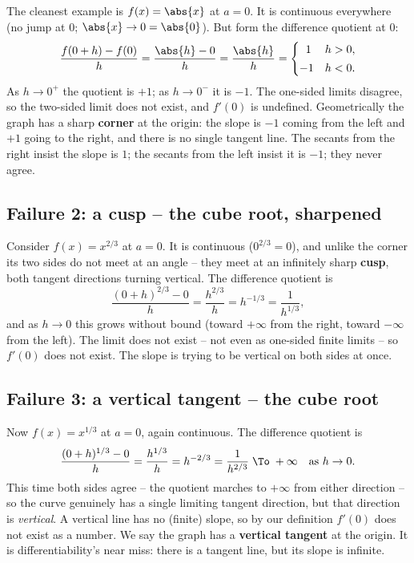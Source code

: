 The cleanest example is $f(x) = \abs{x}$ at $a = 0$. It is continuous everywhere
(no jump at $0$; $\abs{x} \to 0 = \abs{0}$). But form the difference quotient at
$0$:
\[
  \frac{f(0 + h) - f(0)}{h} = \frac{\abs{h} - 0}{h} = \frac{\abs{h}}{h}
  = \begin{cases} \;\;1 & h > 0, \\[2pt] -1 & h < 0. \end{cases}
\]
As $h \to 0^+$ the quotient is $+1$; as $h \to 0^-$ it is $-1$. The one-sided
limits disagree, so the two-sided limit does not exist, and $f'(0)$ is undefined.
Geometrically the graph has a sharp \textbf{corner} at the origin: the slope is
$-1$ coming from the left and $+1$ going to the right, and there is no single
tangent line. The secants from the right insist the slope is $1$; the secants from
the left insist it is $-1$; they never agree.

\subsection*{Failure 2: a cusp -- the cube root, sharpened}

Consider $f(x) = x^{2/3}$ at $a = 0$. It is continuous ($0^{2/3} = 0$), and unlike
the corner its two sides do not meet at an angle -- they meet at an infinitely
sharp \textbf{cusp}, both tangent directions turning vertical. The difference
quotient is
\[
  \frac{(0+h)^{2/3} - 0}{h} = \frac{h^{2/3}}{h} = h^{-1/3} = \frac{1}{h^{1/3}},
\]
and as $h \to 0$ this grows without bound (toward $+\infty$ from the right, toward
$-\infty$ from the left). The limit does not exist -- not even as one-sided finite
limits -- so $f'(0)$ does not exist. The slope is trying to be vertical on both
sides at once.

\subsection*{Failure 3: a vertical tangent -- the cube root}

Now $f(x) = x^{1/3}$ at $a = 0$, again continuous. The difference quotient is
\[
  \frac{(0+h)^{1/3} - 0}{h} = \frac{h^{1/3}}{h} = h^{-2/3} = \frac{1}{h^{2/3}}
  \;\To\; +\infty \quad \text{as } h \to 0.
\]
This time both sides agree -- the quotient marches to $+\infty$ from either
direction -- so the curve genuinely has a single limiting tangent direction, but
that direction is \emph{vertical}. A vertical line has no (finite) slope, so by
our definition $f'(0)$ does not exist as a number. We say the graph has a
\textbf{vertical tangent} at the origin. It is differentiability's near miss: there
is a tangent line, but its slope is infinite.

